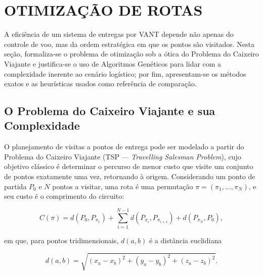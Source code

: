 
\section{OTIMIZAÇÃO DE ROTAS}\label{sec:otimizacao}

A eficiência de um sistema de entregas por VANT depende não apenas do controle de voo, mas da ordem estratégica em que os pontos são visitados. Nesta seção, formaliza-se o problema de otimização sob a ótica do Problema do Caixeiro Viajante e justifica-se o uso de Algoritmos Genéticos para lidar com a complexidade inerente ao cenário logístico; por fim, apresentam-se os métodos exatos e as heurísticas usados como referência de comparação.

\subsection{O Problema do Caixeiro Viajante e sua Complexidade}\label{subsec:tsp}

O planejamento de visitas a pontos de entrega pode ser modelado a partir do Problema do Caixeiro Viajante (TSP --- \textit{Travelling Salesman Problem}), cujo objetivo clássico é determinar o percurso de menor custo que visite um conjunto de pontos exatamente uma vez, retornando à origem. Considerando um ponto de partida $P_0$ e $N$ pontos a visitar, uma rota é uma permutação $\pi = (\pi_1, \dots, \pi_N)$, e seu custo é o comprimento do circuito:

\begin{equation}\label{eq:rotas_custo}
    C(\pi) = d(P_0, P_{\pi_1}) + \sum_{i=1}^{N-1} d(P_{\pi_i}, P_{\pi_{i+1}}) + d(P_{\pi_N}, P_0),
\end{equation}

\noindent em que, para pontos tridimensionais, $d(a,b)$ é a distância euclidiana

\begin{equation}\label{eq:rotas_distancia}
    d(a,b) = \sqrt{(x_a-x_b)^2 + (y_a-y_b)^2 + (z_a-z_b)^2}.
\end{equation}

